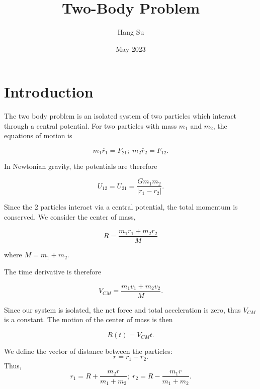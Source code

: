 \documentclass{article}
\title{Two-Body Problem}
\author{Hang Su}
\date{May 2023}
\begin{document}
\maketitle

\section{Introduction}

The two body problem is an isolated system of two particles which interact through a 
central potential. For two particles with mass $m_1$ and $m_2$, the equations of motion is

\begin{equation} \label{eqn:newt}
    m_1 \ddot{r_1} = F_{21} ; \; m_2 \ddot{r_2} = F_{12}.
\end{equation}

In Newtonian gravity, the potentials are therefore 

\begin{equation}
    U_{12} = U_{21} = \frac{G m_1 m_2}{|r_1 - r_2|}.
\end{equation}

Since the 2 particles interact via a central potential, the total momentum is conserved. We consider
the center of mass,

\begin{equation}
    R = \frac{m_1r_1 + m_2r_2}{M}
\end{equation}

where $M = m_1 + m_2$.

The time derivative is therefore 

\begin{equation}
    V_{CM} = \frac{m_1v_1 + m_2v_2}{M}.
\end{equation}

Since our system is isolated, the net force and total acceleration is zero, thus $V_{CM}$ is a constant.
The motion of the center of mass is then

\begin{equation}
    R(t) = V_{CM} t.
\end{equation} 

We define the vector of distance between the particles:
\begin{equation}
    r = r_1 - r_2.
\end{equation}
Thus, 
\begin{equation}
    r_1 = R + \frac{m_2 r}{m_1 + m_2}; \; r_2 = R - \frac{m_1 r}{m_1 + m_2}.
\end{equation}
\end{document}
